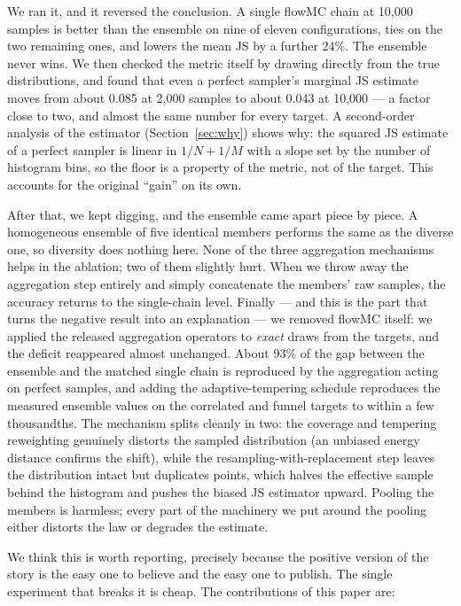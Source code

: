 \documentclass[11pt]{article}
\begin{document}
We ran it, and it reversed the conclusion. A single flowMC chain at 10{,}000
samples is better than the ensemble on nine of eleven configurations, ties on
the two remaining ones, and lowers the mean JS by a further 24\%. The ensemble
never wins. We then checked the metric itself by drawing directly from the
true distributions, and found that even a perfect sampler's marginal JS
estimate moves from about 0.085 at 2{,}000 samples to about 0.043 at 10{,}000
--- a factor close to two, and almost the same number for every target. A
second-order analysis of the estimator (Section~\ref{sec:why}) shows why: the
squared JS estimate of a perfect sampler is linear in $1/N+1/M$ with a slope
set by the number of histogram bins, so the floor is a property of the metric,
not of the target. This accounts for the original ``gain'' on its own.

After that, we kept digging, and the ensemble came apart piece by piece. A
homogeneous ensemble of five identical members performs the same as the
diverse one, so diversity does nothing here. None of the three aggregation
mechanisms helps in the ablation; two of them slightly hurt. When we throw
away the aggregation step entirely and simply concatenate the members' raw
samples, the accuracy returns to the single-chain level. Finally --- and this
is the part that turns the negative result into an explanation --- we removed
flowMC itself: we applied the released aggregation operators to \emph{exact}
draws from the targets, and the deficit reappeared almost unchanged. About
93\% of the gap between the ensemble and the matched single chain is
reproduced by the aggregation acting on perfect samples, and adding the
adaptive-tempering schedule reproduces the measured ensemble values on the
correlated and funnel targets to within a few thousandths. The mechanism
splits cleanly in two: the coverage and tempering reweighting genuinely
distorts the sampled distribution (an unbiased energy distance confirms the
shift), while the resampling-with-replacement step leaves the distribution
intact but duplicates points, which halves the effective sample behind the
histogram and pushes the biased JS estimator upward. Pooling the members is
harmless; every part of the machinery we put around the pooling either
distorts the law or degrades the estimate.

We think this is worth reporting, precisely because the positive version of
the story is the easy one to believe and the easy one to publish. The single
experiment that breaks it is cheap. The contributions of this paper are:
\end{document}
